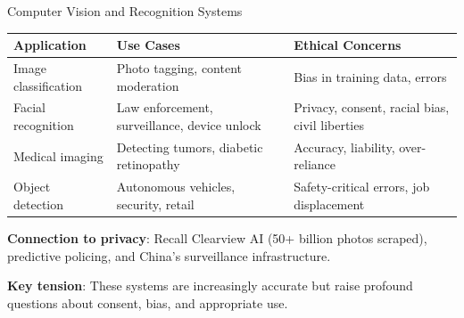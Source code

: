 ﻿\documentclass[aspectratio=169,11pt]{beamer}
\begin{document}
\begin{frame}{Computer Vision and Recognition Systems}
\begin{table}[h]
\centering
\scriptsize
\begin{tabular}{@{}p{2.5cm}p{4cm}p{5.5cm}@{}}
\toprule
\textbf{Application} & \textbf{Use Cases} & \textbf{Ethical Concerns} \\
\midrule
Image classification & Photo tagging, content moderation & Bias in training data, errors \\
\addlinespace
Facial recognition & Law enforcement, surveillance, device unlock & Privacy, consent, racial bias, civil liberties \\
\addlinespace
Medical imaging & Detecting tumors, diabetic retinopathy & Accuracy, liability, over-reliance \\
\addlinespace
Object detection & Autonomous vehicles, security, retail & Safety-critical errors, job displacement \\
\bottomrule
\end{tabular}
\end{table}

\vspace{0.2em}
\textbf{Connection to privacy}: Recall Clearview AI (50+ billion photos scraped), predictive policing, and China's surveillance infrastructure.

\vspace{0.2em}
\textbf{Key tension}: These systems are increasingly accurate but raise profound questions about consent, bias, and appropriate use.
\end{frame}
\end{document}

